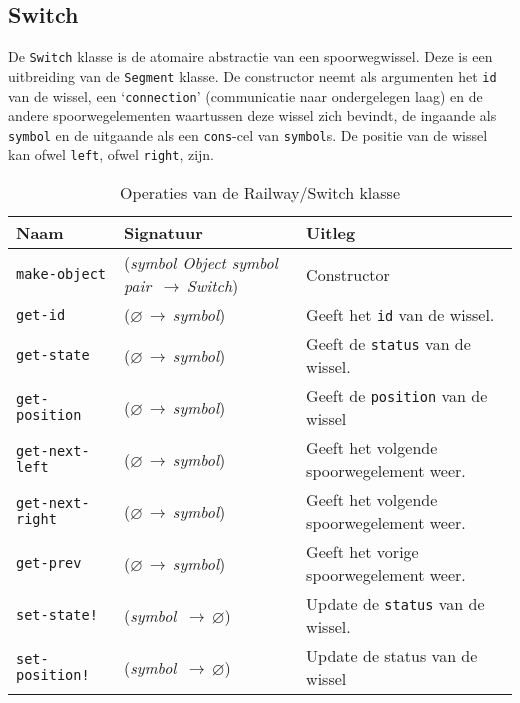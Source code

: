 \documentclass[a4paper, 11pt]{article}
\newcommand{\naar}{\,$\rightarrow$\,}
\renewcommand{\empty}{$\varnothing$}
\newcommand{\<}{\scriptsize\textless\normalsize}
\renewcommand{\>}{\scriptsize\textgreater\normalsize}
\begin{document}
\subsection{Switch} %
De \texttt{Switch} klasse is de atomaire abstractie van een spoorwegwissel. Deze is een uitbreiding van de \texttt{Segment} klasse. De constructor neemt als argumenten het \texttt{id} van de wissel, een \lq\texttt{connection}' (communicatie naar ondergelegen laag) en de andere spoorwegelementen waartussen deze wissel zich bevindt, de ingaande als \texttt{symbol} en de uitgaande als een \texttt{cons}-cel van \texttt{symbol}s. De positie van de wissel kan ofwel \texttt{left}, ofwel \texttt{right}, zijn.
\begin{table}[H]
	\begin{center}
		{
		\begin{tabular}{|l l l|}
			\hline
			\textbf{Naam} & \textbf{Signatuur} & \textbf{Uitleg}\\
			\hline
			\texttt{make-object} & (\textit{symbol Object symbol pair} \naar \textit{Switch}) & Constructor\\
			\hline
			\texttt{get-id} & (\empty \naar \textit{symbol}) & Geeft het \texttt{id} van de wissel.\\
			\texttt{get-state} & (\empty \naar \textit{symbol}) & Geeft de \texttt{status} van de wissel.\\
			\texttt{get-position} & (\empty \naar \textit{symbol}) & Geeft de \texttt{position} van de wissel\\
			\texttt{get-next-left} & (\empty \naar \textit{symbol}) & Geeft het volgende spoorwegelement weer.\\
			\texttt{get-next-right} & (\empty \naar \textit{symbol}) & Geeft het volgende spoorwegelement weer.\\
			\texttt{get-prev} & (\empty \naar \textit{symbol}) & Geeft het vorige spoorwegelement weer.\\
			\texttt{set-state!} & (\textit{symbol} \naar \empty) & Update de \texttt{status} van de wissel.\\
			\texttt{set-position!} & (\textit{symbol} \naar \empty) & Update de status van de wissel\\
			\hline
		\end{tabular}}
		\caption{Operaties van de Railway/Switch klasse}
	\end{center}
\end{table}
\end{document}
